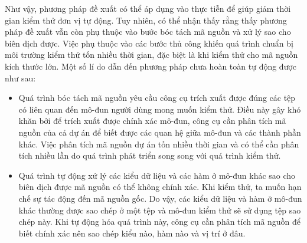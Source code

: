 Như vậy, phương pháp đề xuất có thể áp dụng vào thực tiễn để giúp giảm thời gian kiểm thử đơn vị tự động. Tuy nhiên, có thể nhận thấy rằng thấy phương pháp đề xuất vẫn còn phụ thuộc vào bước bóc tách mã nguồn và xử lý sao cho biên dịch được. Việc phụ thuộc vào các bước thủ công khiến quá trình chuẩn bị môi trường kiểm thử tốn nhiều thời gian, đặc biệt là khi kiểm thử cho mã nguồn kích thước lớn. Một số lí do dẫn đến phương pháp chưa hoàn toàn tự động được như sau:
\begin{itemize}
    \item Quá trình bóc tách mã nguồn yêu cầu công cụ trích xuất được đúng các tệp có liên quan đến mô-đun người dùng mong muốn kiểm thử. Điều này gây khó khăn bởi để trích xuất được chính xác mô-đun, công cụ cần phân tích mã nguồn của cả dự án để biết được các quan hệ giữa mô-đun và các thành phần khác. Việc phân tích mã nguồn dự án tốn nhiều thời gian và có thể cần phân tích nhiều lần do quá trình phát triển song song với quá trình kiểm thử.
    \item Quá trình tự động xử lý các kiểu dữ liệu và các hàm ở mô-đun khác sao cho biên dịch được mã nguồn có thể không chính xác. Khi kiểm thử, ta muốn hạn chế sự tác động đến mã nguồn gốc. Do vậy, các kiểu dữ liệu và hàm ở mô-đun khác thường được sao chép ở một tệp và mô-đun kiểm thử sẽ sử dụng tệp sao chép này. Khi tự động hóa quá trình này, công cụ cần phân tích mã nguồn để biết chính xác nên sao chép kiểu nào, hàm nào và vị trí ở đâu.
\end{itemize}


